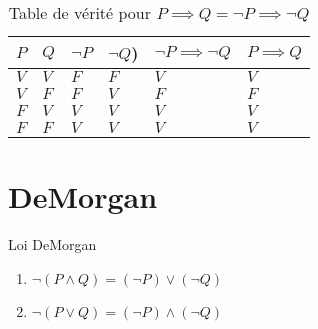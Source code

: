 \documentclass[16pt]{report}
\begin{document}
\begin{multicols*}{2}
            \begin{table}[H]
                \caption{Table de vérité pour $ P \implies Q = \neg P \implies \neg Q$}
                \begin{center}
                \renewcommand{\arraystretch}{1.5}
                \selectfont
                \footnotesize
            \begin{tabular}{|l|l||l|l|l||l|}
                    \arrayrulecolor{blue}\hline
                    \rowcolor{lightBlue}
                    \textcolor{myb}{$P$} & \textcolor{myb}{$Q$} & \textcolor{myb}{$\neg P$} & 
                    \textcolor{myb}{$\neg Q$)} & \textcolor{myb}{$\neg P \implies \neg Q$} & 
                    \textcolor{myb}{$P \implies  Q$}
                    \\
                    \hline
                    \hline
                    \arrayrulecolor{black}
                    \cellcolor{myg} $V$ & \cellcolor{myg} $V$ & \cellcolor{myr} $F$ &
                    \cellcolor{myr} $F$ & \cellcolor{myg} $V$ & \cellcolor{myg} $V$ 
                    \\
                    \hline
                    \cellcolor{myg} $V$ & \cellcolor{myr} $F$ & \cellcolor{myr} $F$ & 
                    \cellcolor{myg} $V$ & \cellcolor{myr} $F$ & \cellcolor{myr} $F$ 
                    \\ 
                    \hline 
                    \cellcolor{myr} $F$ & \cellcolor{myg} $V$ & \cellcolor{myg} $V$ &
                    \cellcolor{myg} $V$ & \cellcolor{myg} $V$ & \cellcolor{myg} $V$ 
                    \\ 
                    \hline
                    \cellcolor{myr} $F$ & \cellcolor{myr} $F$ & \cellcolor{myg} $V$ &
                    \cellcolor{myg} $V$ & \cellcolor{myg} $V$ & \cellcolor{myg} $V$
                    \\ 
                    \hline
                    \end{tabular}
            \end{center}
            \end{table} 


            

            \section{DeMorgan} 
            \begin{Concept}{Loi DeMorgan}{}
                \begin{enumerate}
                    \item $\neg (P \land Q) = (\neg P) \lor (\neg Q)$
                    \item $\neg (P \lor Q) = (\neg P) \land (\neg Q)$
                \end{enumerate}
            \end{Concept}
                    

\end{multicols*}
\end{document}
